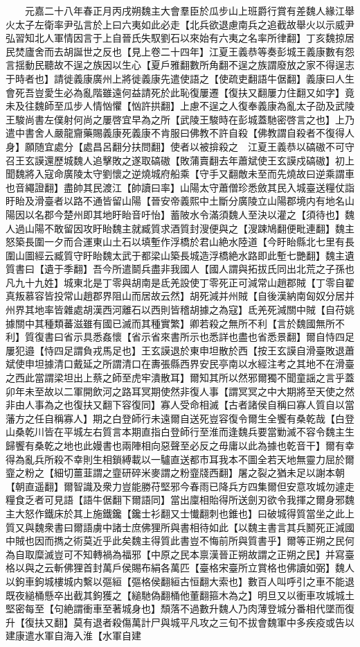 　　元嘉二十八年春正月丙戌朔魏主大會羣臣於瓜步山上班爵行賞有差魏人緣江舉火太子左衛率尹弘言於上曰六夷如此必走【北兵欲退慮南兵之追截故舉火以示威尹弘習知北人軍情因言于上自晉氏失馭劉石以來始有六夷之名率所律翻】丁亥魏掠居民焚廬舍而去胡誕世之反也【見上卷二十四年】江夏王義恭等奏彭城王義康數有怨言揺動民聽故不逞之族因以生心【夏戶雅翻數所角翻不逞之族謂廢放之家不得逞志于時者也】請徙義康廣州上將徙義康先遣使語之【使疏吏翻語牛倨翻】義康曰人生會死吾豈愛生必為亂階雖遠何益請死於此恥復屢遷【復扶又翻屢力住翻又如字】竟未及往魏師至瓜步人情忷懼【忷許拱翻】上慮不逞之人復奉義康為亂太子劭及武陵王駿尚書左僕射何尚之屢啓宜早為之所【武陵王駿時在彭城蓋馳密啓言之也】上乃遣中書舍人嚴龍齎藥賜義康死義康不肯服曰佛教不許自殺【佛教謂自殺者不復得人身】願随宜處分【處昌呂翻分扶問翻】使者以被揜殺之　江夏王義恭以碻磝不可守召王玄謨還歷城魏人追擊敗之遂取碻磝【敗蒲賣翻去年蕭斌使王玄謨戍碻磝】初上聞魏將入寇命廣陵太守劉懷之逆燒城府船乘【守手又翻敵未至而先燒故曰逆乘謂車也音繩證翻】盡帥其民渡江【帥讀曰率】山陽太守蕭僧珍悉斂其民入城臺送糧仗詣盱眙及滑臺者以路不通皆留山陽【晉安帝義熙中土斷分廣陵立山陽郡境内有地名山陽因以名郡今楚州即其地盱眙音吁怡】蓄陂水令滿須魏人至決以灌之【須待也】魏人過山陽不敢留因攻盱眙魏主就臧質求酒質封溲便與之【溲踈鳩翻便毗連翻】魏主怒築長圍一夕而合運東山土石以填塹作浮橋於君山絶水陸道【今盱眙縣北七里有長圍山圖經云臧質守盱眙魏太武于都梁山築長城造浮橋絶水路即此塹七艷翻】魏主遺質書曰【遺于季翻】吾今所遣鬬兵盡非我國人【國人謂與拓拔氏同出北荒之子孫也凡九十九姓】城東北是丁零與胡南是氐羌設使丁零死正可減常山趙郡賊【丁零自翟真叛慕容皆投常山趙郡界阻山而居故云然】胡死減并州賊【自後漢納南匈奴分居并州界其地率皆雜處胡漢西河離石以西則皆稽胡據之為寇】氐羌死減關中賊【自苻姚據關中其種類蕃滋雖有國已滅而其種實繁】卿若殺之無所不利【言於魏國無所不利】質復書曰省示具悉姦懷【省示省來書所示也悉詳也盡也省悉景翻】爾自恃四足屢犯邉【恃四足謂負戎馬足也】王玄謨退於東申坦散於西【按王玄謨自滑臺敗退蕭斌使申坦據清口戴延之所謂清口在夀張縣西界安民亭南以水經注考之其地不在滑臺之西此當謂梁坦出上蔡之師至虎牢潰散耳】爾知其所以然邪爾獨不聞童謡之言乎蓋卯年未至故以二軍開飲河之路耳冥期使然非復人事【謂冥冥之中大期將至天使之然非由人事為之也復扶又翻下容復同】寡人受命相滅【古者諸侯自稱曰寡人質自以當藩方之任自稱寡人】期之白登師行未遠爾自送死豈容復令爾生全饗有桑乾哉【白登山桑乾川皆在平城左右質言本期直指白登師行至淮而逢魏兵要當勦滅不容令魏主生歸饗有桑乾之地也此嫚書也兩陣相向惡聲至必反之毋庸以此為據也乾音干】爾有幸得為亂兵所殺不幸則生相鎖縛載以一驢直送都市耳我本不圖全若天地無靈力屈於爾韲之粉之【細切薑韮謂之韲研碎米麥謂之粉韲牋西翻】屠之裂之猶未足以謝本朝【朝直遥翻】爾智識及衆力豈能勝苻堅邪今春雨已降兵方四集爾但安意攻城勿遽走糧食乏者可見語【語牛倨翻下爾語同】當出廩相貽得所送劍刃欲令我揮之爾身邪魏主大怒作鐵床於其上施鐵鑱【鑱士衫翻又士懴翻刺也錐也】曰破城得質當坐之此上質又與魏衆書曰爾語虜中諸士庶佛狸所與書相待如此【以魏主書言其兵鬭死正減國中賊也因而擕之術莫近乎此矣魏主得質此書豈不悔前所與質書乎】爾等正朔之民何為自取糜滅豈可不知轉禍為福邪【中原之民本禀漢晉正朔故謂之正朔之民】并寫臺格以與之云斬佛狸首封萬戶侯賜布絹各萬匹【臺格宋臺所立賞格也佛讀如弼】魏人以鉤車鉤城樓城内繫以彄絙【彄格侯翻絙古恒翻大索也】數百人叫呼引之車不能退既夜縋桶懸卒出截其鉤獲之【縋馳偽翻桶他董翻箍木為之】明旦又以衝車攻城城土堅密每至【句絶謂衝車至著城身也】頹落不過數升魏人乃肉薄登城分番相代墜而復升【復扶又翻】莫有退者殺傷萬計尸與城平凡攻之三旬不拔會魏軍中多疾疫或告以建康遣水軍自海入淮【水軍自建